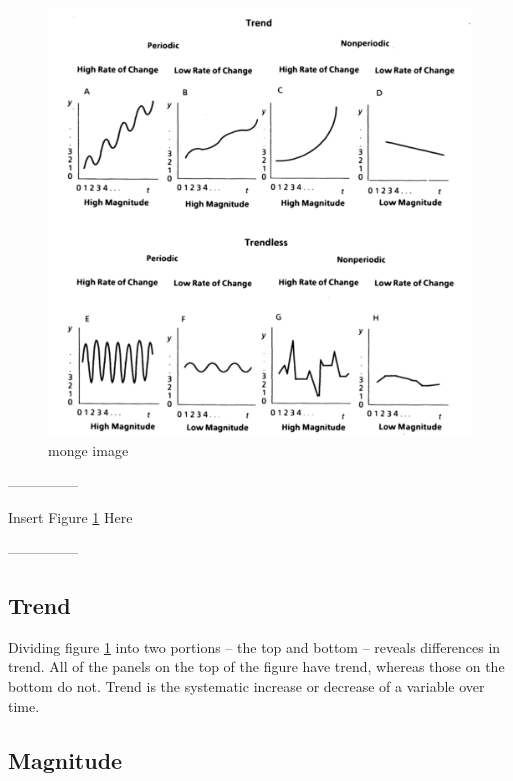 \documentclass[english,,man]{apa6}
\theoremstyle{definition}
\theoremstyle{definition}
\theoremstyle{definition}
\theoremstyle{remark}
\begin{document}
\begin{figure}
\centering
\includegraphics{figs/unnamed-chunk-6-1.pdf}
\caption{\label{fig:unnamed-chunk-6}monge image\label{monge}}
\end{figure}

\begin{center}

---------------

Insert Figure \ref{monge} Here

---------------

\end{center}

\hypertarget{trend}{%
\subsection{Trend}\label{trend}}

Dividing figure \ref{monge} into two portions -- the top and bottom --
reveals differences in trend. All of the panels on the top of the figure
have trend, whereas those on the bottom do not. Trend is the systematic
increase or decrease of a variable over time.

\hypertarget{magnitude}{%
\subsection{Magnitude}\label{magnitude}}
\end{document}
